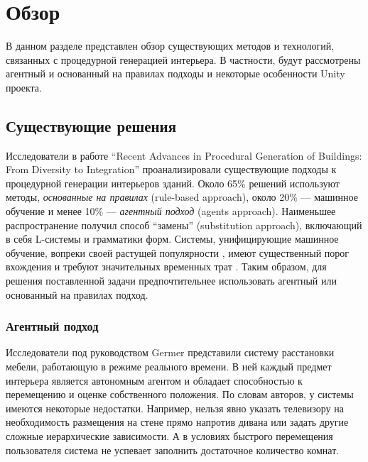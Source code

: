 
\section{Обзор}

В данном разделе представлен обзор существующих методов и технологий, связанных с процедурной генерацией интерьера. В частности, будут рассмотрены агентный и основанный на правилах подходы и некоторые особенности Unity проекта.


\subsection{Существующие решения}

Исследователи в работе \enquote{Recent Advances in Procedural Generation of Buildings: From Diversity to Integration} проанализировали существующие подходы к процедурной генерации интерьеров зданий. Около 65\% решений используют методы, \textit{основанные на правилах} (rule-based approach), около 20\% --- машинное обучение и менее 10\% --- \textit{агентный подход} (agents approach). Наименьшее распространение получил способ \enquote{замены} (substitution approach), включающий в себя L-системы и грамматики форм. Системы, унифицирующие машинное обучение, вопреки своей растущей популярности \cite{kutzias2023recent}, имеют существенный порог вхождения и требуют значительных временных трат \cite{kan2021automatic,balint2019generalized}. Таким образом, для решения поставленной задачи предпочтительнее использовать агентный или основанный на правилах подход.

\subsubsection{Агентный подход}

Исследователи под руководством Germer \cite{germer2009procedural} представили систему расстановки мебели, работающую в режиме реального времени. В ней каждый предмет интерьера является автономным агентом и обладает способностью к перемещению и оценке собственного положения. По словам авторов, у системы имеются некоторые недостатки. Например, нельзя явно указать телевизору на необходимость размещения на стене прямо напротив дивана или задать другие сложные иерархические зависимости. А в условиях быстрого перемещения пользователя система не успевает заполнить достаточное количество комнат.


